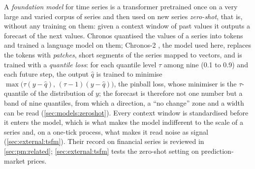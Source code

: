 A \emph{foundation model} for time series is a transformer pretrained once on a very large
and varied corpus of series and then used on new series \emph{zero-shot}, that is, without
any training on them: given a context window of past values it outputs a forecast of the
next values.  Chronos \cite{ansari2024chronos} quantised the values of a series into
tokens and trained a language model on them; Chronos-2 \cite{ansari2025chronos2}, the model
used here, replaces the tokens with \emph{patches}, short segments of the series mapped to
vectors, and is trained with a \emph{quantile loss}: for each quantile level $\tau$ among
nine (0.1 to 0.9) and each future step, the output $\hat{q}$ is trained to minimise
$\max\bigl(\tau (y - \hat{q}),\, (\tau - 1)(y - \hat{q})\bigr)$, the pinball loss, whose
minimiser is the $\tau$-quantile of the distribution of $y$; the forecast is therefore
not one number but a band of nine quantiles, from which a direction, a ``no change'' zone
and a width can be read (\cref{sec:models:zeroshot}).  Every context window is standardised
before it enters the model, which is what makes the model indifferent to the scale of a
series and, on a one-tick process, what makes it read noise as signal
(\cref{sec:external:tsfm}).  Their record on financial series is reviewed in
\cref{sec:pm:related}; \cref{sec:external:tsfm} tests the zero-shot setting on
prediction-market prices.
